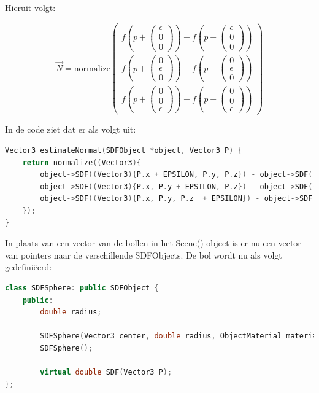 \documentclass[12pt, a4paper]{article}
\newcommand*{\ora}{\overrightarrow}
\begin{document}
Hieruit volgt:

\[
\ora{N}=\text{normalize}\begin{pmatrix} 
f\left(p+\begin{pmatrix} \epsilon \\ 0 \\ 0 \end{pmatrix}\right)-f\left(p-\begin{pmatrix} \epsilon \\ 0 \\ 0 \end{pmatrix}\right) \\
f\left(p+\begin{pmatrix} 0 \\ \epsilon \\ 0 \end{pmatrix}\right)-f\left(p-\begin{pmatrix} 0 \\ \epsilon \\ 0 \end{pmatrix}\right) \\
f\left(p+\begin{pmatrix} 0 \\ 0 \\ \epsilon \end{pmatrix}\right)-f\left(p-\begin{pmatrix} 0 \\ 0 \\ \epsilon \end{pmatrix}\right)
\end{pmatrix}\]

In de code ziet dat er als volgt uit:
\begin{lstlisting}[language=C++]
Vector3 estimateNormal(SDFObject *object, Vector3 P) {
    return normalize((Vector3){
        object->SDF((Vector3){P.x + EPSILON, P.y, P.z}) - object->SDF((Vector3){P.x - EPSILON, P.y, P.z}),
        object->SDF((Vector3){P.x, P.y + EPSILON, P.z}) - object->SDF((Vector3){P.x, P.y - EPSILON, P.z}),
        object->SDF((Vector3){P.x, P.y, P.z  + EPSILON}) - object->SDF((Vector3){P.x, P.y, P.z - EPSILON})
    });
}
\end{lstlisting}

In plaats van een vector van de bollen in het Scene() object is er nu een vector van pointers naar de verschillende SDFObjects. De bol wordt nu als volgt gedefiniëerd:
\begin{lstlisting}[language=C++]
class SDFSphere: public SDFObject {
    public:
        double radius;

        SDFSphere(Vector3 center, double radius, ObjectMaterial material);
        SDFSphere();

        virtual double SDF(Vector3 P);
};
\end{lstlisting}
\end{document}

